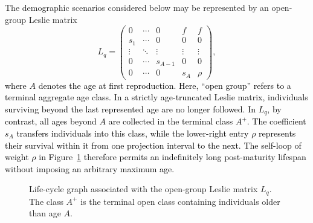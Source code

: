 \documentclass[11pt,a4paper]{amsart}
\begin{document}
The demographic scenarios considered below may be represented by an
open-group Leslie matrix \cite{ElaydiCushing2024}
\[
L_q=
\begin{pmatrix}
0 & \cdots & 0 & f & f\\
s_1 & \cdots & 0 & 0 & 0\\
\vdots & \ddots & \vdots & \vdots & \vdots\\
0 & \cdots & s_{A-1} & 0 & 0\\
0 & \cdots & 0 & s_A & \rho
\end{pmatrix},
\]
\textcolor{black}{where $A$ denotes the age at first reproduction. Here, ``open group''
refers to a terminal aggregate age class. In a strictly age-truncated Leslie matrix, individuals
surviving beyond the last represented age are no longer followed.
In $L_q$, by contrast, all ages beyond $A$ are collected in the
terminal class $A^{+}$. The coefficient $s_A$ transfers individuals
into this class, while the lower-right entry $\rho$ represents their
survival within it from one projection interval to the next. The
self-loop of weight $\rho$ in Figure~\ref{fig:open-group-graph}
therefore permits an indefinitely long post-maturity lifespan without
imposing an arbitrary maximum age.}
\begin{figure}[H]
\centering
{}

\caption{Life-cycle graph associated with the open-group Leslie
matrix $L_q$. The class $A^{+}$ is the terminal open class containing
individuals older than age $A$.}
\label{fig:open-group-graph}
\end{figure}
\end{document}
